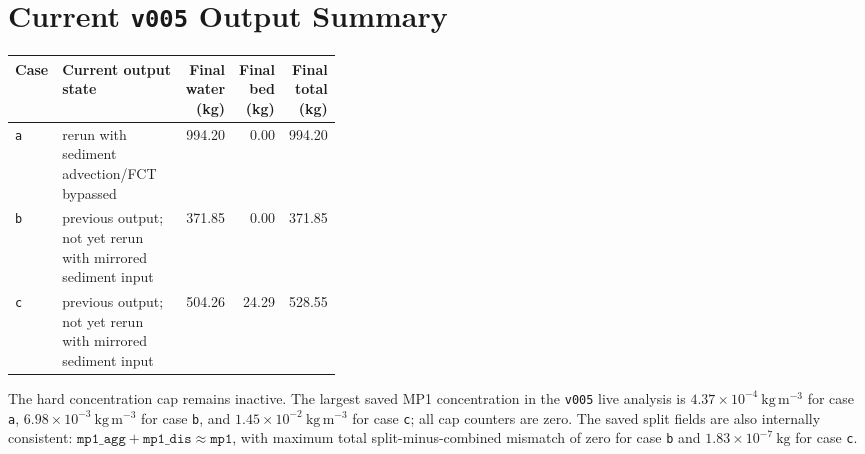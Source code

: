 \documentclass[11pt]{article}
\begin{document}
\section*{Current \texttt{v005} Output Summary}
\begin{table}[h]
\centering
\small
\begin{tabular}{lp{0.38\linewidth}rrr}
\toprule
Case & Current output state & Final water (kg) & Final bed (kg) &
Final total (kg) \\
\midrule
\texttt{a} & rerun with sediment advection/FCT bypassed & 994.20 & 0.00 &
994.20 \\
\texttt{b} & previous output; not yet rerun with mirrored sediment input &
371.85 & 0.00 & 371.85 \\
\texttt{c} & previous output; not yet rerun with mirrored sediment input &
504.26 & 24.29 & 528.55 \\
\bottomrule
\end{tabular}
\end{table}

The hard concentration cap remains inactive.  The largest saved MP1
concentration in the \texttt{v005} live analysis is
\(4.37\times10^{-4}~\mathrm{kg\,m^{-3}}\) for case \texttt{a},
\(6.98\times10^{-3}~\mathrm{kg\,m^{-3}}\) for case \texttt{b}, and
\(1.45\times10^{-2}~\mathrm{kg\,m^{-3}}\) for case \texttt{c}; all cap counters
are zero.  The saved split fields are also internally consistent:
\(\texttt{mp1\_agg}+\texttt{mp1\_dis}\approx\texttt{mp1}\), with maximum total
split-minus-combined mismatch of zero for case \texttt{b} and
\(1.83\times10^{-7}~\mathrm{kg}\) for case \texttt{c}.
\end{document}
